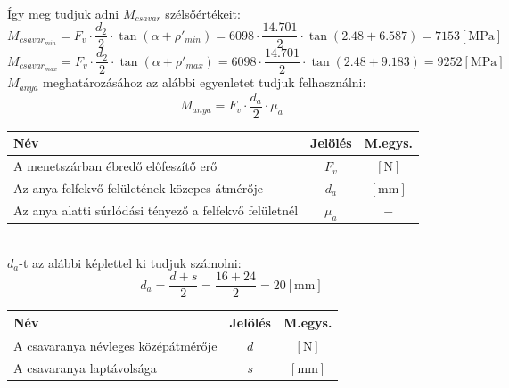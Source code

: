 \documentclass[10pt, a4paper]{article}
\newcommand{\n}{\mathrm{\left[N\right]}}
\newcommand{\mpa}{\mathrm{\left[MPa\right]}}
\newcommand{\mm}{\mathrm{\left[mm\right]}}
\begin{document}
			\renewcommand{\arraystretch}{1}\\
	\newpage
	Így meg tudjuk adni $M_{csavar}$ szélsőértékeit:
	\begin{equation}
			M_{csavar_{min}} = F_v \cdot \dfrac{d_2}{2} \cdot \tan(\alpha + \rho'_{min}) = 6098 \cdot \dfrac{14.701}{2} \cdot \tan(2.48 + 6.587) = 7153 \mpa\tag{5.1}
	\end{equation}
	\begin{equation}
			M_{csavar_{max}} = F_v \cdot \dfrac{d_2}{2} \cdot \tan(\alpha + \rho'_{max}) = 6098 \cdot \dfrac{14.701}{2} \cdot \tan(2.48 + 9.183) = 9252 \mpa\tag{5.1} \label{Mcsavar}
	\end{equation}
	$M_{anya}$ meghatározásához az alábbi egyenletet tudjuk felhasználni:
	\begin{equation}
		M_{anya} = F_v \cdot \dfrac{d_a}{2} \cdot \mu_a \tag{5.2}
	\end{equation}
	\vspace{-20pt}
		\renewcommand{\arraystretch}{1.4}
							\begin{table}[!h]
								\centering
								\begin{tabular}{l|c|c}
									\textbf{Név}                              & \textbf{Jelölés} & \textbf{M.egys.} \\ \hline
									A menetszárban ébredő előfeszítő erő                     & $F_v$                & $\n$          \\
									Az anya felfekvő felületének közepes átmérője          & $d_a$                & $\mm$			 \\
									Az anya alatti súrlódási tényező a felfekvő felületnél           & $\mu_a$                & $-$			 	       
								\end{tabular}
							\end{table}
		\renewcommand{\arraystretch}{1}\\
	$d_a$-t az alábbi képlettel ki tudjuk számolni:
	\begin{equation}
		d_a = \dfrac{d + s}{2} = \dfrac{16 + 24}{2} = 20 \mm\tag{5.2.1}
	\end{equation}
	\vspace{-20pt}
			\renewcommand{\arraystretch}{1.4}
								\begin{table}[!h]
									\centering
									\begin{tabular}{l|c|c}
										\textbf{Név}                              & \textbf{Jelölés} & \textbf{M.egys.} \\ \hline
										A csavaranya névleges középátmérője                     & $d$                & $\n$          \\
										A csavaranya laptávolsága          & $s$                & $\mm$			 		 	       
									\end{tabular}
								\end{table}
\end{document}

